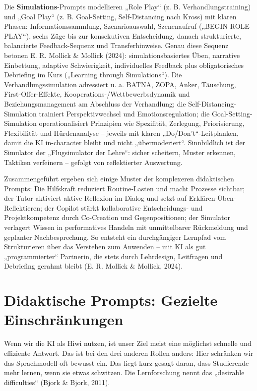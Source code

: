 \documentclass[
  ngerman,
  letterpaper,
  DIV=11]{scrreprt}
\begin{document}
Die \textbf{Simulations}-Prompts modellieren „Role Play`` (z. B.
Verhandlungstraining) und „Goal Play`` (z. B. Goal-Setting,
Self-Distancing nach Kross) mit klaren Phasen: Informationssammlung,
Szenarioauswahl, Szenenaufruf („BEGIN ROLE PLAY``), sechs Züge bis zur
konsekutiven Entscheidung, danach strukturierte, balancierte
Feedback-Sequenz und Transferhinweise. Genau diese Sequenz betonen E. R.
Mollick \& Mollick (2024): simulationsbasiertes Üben, narrative
Einbettung, adaptive Schwierigkeit, individuelles Feedback plus
obligatorisches Debriefing im Kurs („Learning through Simulations``).
Die Verhandlungssimulation adressiert u. a. BATNA, ZOPA, Anker,
Täuschung, First-Offer-Effekte, Kooperations-/Wettbewerbsdynamik und
Beziehungsmanagement am Abschluss der Verhandlung; die
Self-Distancing-Simulation trainiert Perspektivwechsel und
Emotionsregulation; die Goal-Setting-Simulation operationalisiert
Prinzipien wie Spezifität, Zerlegung, Priorisierung, Flexibilität und
Hürdenanalyse -- jeweils mit klaren „Do/Don't``-Leitplanken, damit die
KI in-character bleibt und nicht „übermoderiert``. Sinnbildlich ist der
Simulator der „Flugsimulator der Lehre``: sicher scheitern, Muster
erkennen, Taktiken verfeinern -- gefolgt von reflektierter Auswertung.

Zusammengeführt ergeben sich einige Muster der komplexeren didaktischen
Prompts: Die Hilfskraft reduziert Routine-Lasten und macht Prozesse
sichtbar; der Tutor aktiviert aktive Reflexion im Dialog und setzt auf
Erklären-Üben-Reflektieren; der Copilot stärkt kollaborative
Entscheidungs- und Projektkompetenz durch Co-Creation und
Gegenpositionen; der Simulator verlagert Wissen in performatives Handeln
mit unmittelbarer Rückmeldung und geplanter Nachbesprechung. So entsteht
ein durchgängiger Lernpfad vom Strukturieren über das Verstehen zum
Anwenden -- mit KI als gut „programmierter`` Partnerin, die stets durch
Lehrdesign, Leitfragen und Debriefing gerahmt bleibt (E. R. Mollick \&
Mollick, 2024).

\section{Didaktische Prompts: Gezielte
Einschränkungen}\label{sec-constraints}

Wenn wir die KI als Hiwi nutzen, ist unser Ziel meist eine möglichst
schnelle und effiziente Antwort. Das ist bei den drei anderen Rollen
anders: Hier schränken wir das Sprachmodell oft bewusst ein. Das liegt
kurz gesagt daran, dass Studierende mehr lernen, wenn sie etwas
schwitzen. Die Lernforschung nennt das „desirable difficulties`` (Bjork
\& Bjork, 2011).
\end{document}
